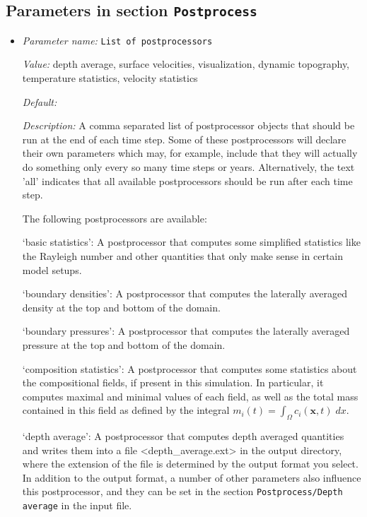 \subsection{Parameters in section \tt Postprocess}
\label{parameters:Postprocess}

\begin{itemize}
\item {\it Parameter name:} {\tt List of postprocessors}
\label{parameters:Postprocess/List of postprocessors}


{\it Value:} depth average, surface velocities, visualization, dynamic topography, temperature statistics, velocity statistics


{\it Default:} 


{\it Description:} A comma separated list of postprocessor objects that should be run at the end of each time step. Some of these postprocessors will declare their own parameters which may, for example, include that they will actually do something only every so many time steps or years. Alternatively, the text 'all' indicates that all available postprocessors should be run after each time step.

The following postprocessors are available:

`basic statistics': A postprocessor that computes some simplified statistics like the Rayleigh number and other quantities that only make sense in certain model setups.

`boundary densities': A postprocessor that computes the laterally averaged density at the top and bottom of the domain.

`boundary pressures': A postprocessor that computes the laterally averaged pressure at the top and bottom of the domain.

`composition statistics': A postprocessor that computes some statistics about the compositional fields, if present in this simulation. In particular, it computes maximal and minimal values of each field, as well as the total mass contained in this field as defined by the integral $m_i(t) = \int_\Omega c_i(\mathbf x,t) \; dx$.

`depth average': A postprocessor that computes depth averaged quantities and writes them into a file <depth_average.ext> in the output directory, where the extension of the file is determined by the output format you select. In addition to the output format, a number of other parameters also influence this postprocessor, and they can be set in the section \texttt{Postprocess/Depth average} in the input file.


\end{itemize}
